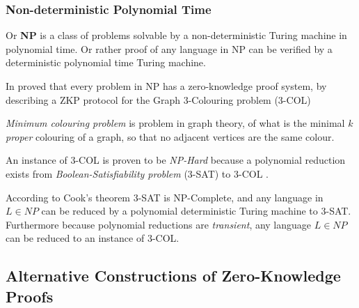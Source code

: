 \subsubsection{Non-deterministic Polynomial Time}

Or \textbf{NP} is a class of problems solvable by a non-deterministic Turing machine in polynomial time. Or rather proof of any language in NP can be verified by a deterministic polynomial time Turing machine.

\bigskip

In \cite{GMW} proved that every problem in NP has a zero-knowledge proof system, by describing a ZKP protocol for the Graph 3-Colouring problem (3-COL)

\textit{Minimum colouring problem} is problem in graph theory, of what is the minimal $k$ \textit{proper} colouring of a graph, so that no adjacent vertices are the same colour.

An instance of 3-COL is proven to be \textit{NP-Hard} because a polynomial reduction exists from \textit{Boolean-Satisfiability problem} (3-SAT) to 3-COL \cite{mouatadid2014introduction}.

According to Cook's theorem \cite{cook1971complexity} 3-SAT is NP-Complete, and any language in $L \in NP$ can be reduced by a polynomial deterministic Turing machine to 3-SAT. Furthermore because polynomial reductions are \textit{transient}, any language $L \in NP$ can be reduced to an instance of 3-COL.

\subsection{Alternative Constructions of Zero-Knowledge Proofs}
